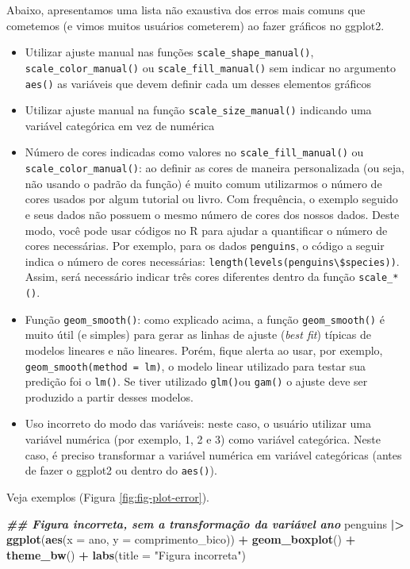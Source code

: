 \documentclass[
]{article}
\newenvironment{Shaded}{\begin{snugshade}}{\end{snugshade}}
\newcommand{\AttributeTok}[1]{\textcolor[rgb]{0.13,0.29,0.53}{#1}}
\newcommand{\DocumentationTok}[1]{\textcolor[rgb]{0.56,0.35,0.01}{\textbf{\textit{#1}}}}
\newcommand{\FunctionTok}[1]{\textcolor[rgb]{0.13,0.29,0.53}{\textbf{#1}}}
\newcommand{\NormalTok}[1]{#1}
\newcommand{\SpecialCharTok}[1]{\textcolor[rgb]{0.81,0.36,0.00}{\textbf{#1}}}
\newcommand{\StringTok}[1]{\textcolor[rgb]{0.31,0.60,0.02}{#1}}
\begin{document}
Abaixo, apresentamos uma lista não exaustiva dos erros mais comuns que cometemos (e vimos muitos usuários cometerem) ao fazer gráficos no ggplot2.

\begin{itemize}
\item
  Utilizar ajuste manual nas funções \texttt{scale\_shape\_manual()}, \texttt{scale\_color\_manual()} ou \texttt{scale\_fill\_manual()} sem indicar no argumento \texttt{aes()} as variáveis que devem definir cada um desses elementos gráficos
\item
  Utilizar ajuste manual na função \texttt{scale\_size\_manual()} indicando uma variável categórica em vez de numérica
\item
  Número de cores indicadas como valores no \texttt{scale\_fill\_manual()} ou \texttt{scale\_color\_manual()}: ao definir as cores de maneira personalizada (ou seja, não usando o padrão da função) é muito comum utilizarmos o número de cores usados por algum tutorial ou livro. Com frequência, o exemplo seguido e seus dados não possuem o mesmo número de cores dos nossos dados. Deste modo, você pode usar códigos no R para ajudar a quantificar o número de cores necessárias. Por exemplo, para os dados \texttt{penguins}, o código a seguir indica o número de cores necessárias: \texttt{length(levels(penguins\textbackslash{}\$species))}. Assim, será necessário indicar três cores diferentes dentro da função \texttt{scale\_*()}.
\item
  Função \texttt{geom\_smooth()}: como explicado acima, a função \texttt{geom\_smooth()} é muito útil (e simples) para gerar as linhas de ajuste (\emph{best fit}) típicas de modelos lineares e não lineares. Porém, fique alerta ao usar, por exemplo, \texttt{geom\_smooth(method\ =\ lm)}, o modelo linear utilizado para testar sua predição foi o \texttt{lm()}. Se tiver utilizado \texttt{glm()}ou \texttt{gam()} o ajuste deve ser produzido a partir desses modelos.
\item
  Uso incorreto do modo das variáveis: neste caso, o usuário utilizar uma variável numérica (por exemplo, 1, 2 e 3) como variável categórica. Neste caso, é preciso transformar a variável numérica em variável categóricas (antes de fazer o ggplot2 ou dentro do \texttt{aes()}).
\end{itemize}

Veja exemplos (Figura \ref{fig:fig-plot-error}).

\begin{Shaded}
\begin{Highlighting}[]
\DocumentationTok{\#\# Figura incorreta, sem a transformação da variável ano}
\NormalTok{penguins }\SpecialCharTok{|\textgreater{}}
    \FunctionTok{ggplot}\NormalTok{(}\FunctionTok{aes}\NormalTok{(}\AttributeTok{x =}\NormalTok{ ano, }\AttributeTok{y =}\NormalTok{ comprimento\_bico)) }\SpecialCharTok{+}
    \FunctionTok{geom\_boxplot}\NormalTok{() }\SpecialCharTok{+} 
    \FunctionTok{theme\_bw}\NormalTok{() }\SpecialCharTok{+}
    \FunctionTok{labs}\NormalTok{(}\AttributeTok{title =} \StringTok{"Figura incorreta"}\NormalTok{)}
\end{Highlighting}
\end{Shaded}
\end{document}
